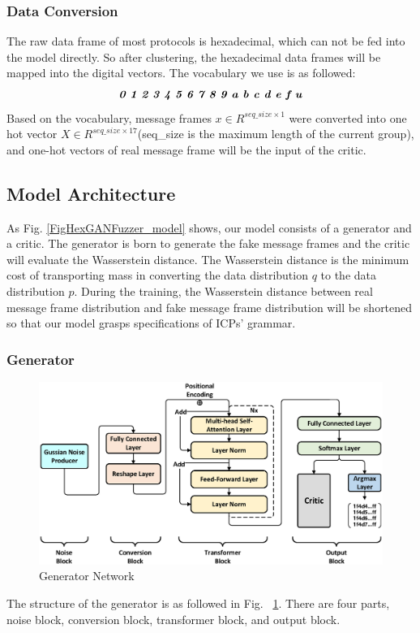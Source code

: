 \subsubsection{\textbf{Data Conversion}}
The raw data frame of most protocols is hexadecimal, which can not be fed into the model directly. So after clustering, the hexadecimal data frames will be mapped into the digital vectors. The vocabulary we use is as followed:
\begin{equation}
\textit{\textbf{0 1 2 3 4 5 6 7 8 9 a b c d e f u}}
\end{equation}
Based on the vocabulary, message frames $x \in R^{seq\_size \times 1}$ were converted into one hot vector $X \in R^{seq\_size \times 17}$(seq\_size is the maximum length of the current group), and one-hot vectors of real message frame will be the input of the critic.



\subsection{Model Architecture}
\label{sec:model_design} 
As Fig. \ref{FigHexGANFuzzer_model} shows, our model consists of a generator and a critic. 
The generator is born to generate the fake message frames and the critic will evaluate the Wasserstein distance. The Wasserstein distance is the minimum cost of transporting mass in converting the data distribution $q$ to the data distribution $p$. During the training, the Wasserstein distance between real message frame distribution and fake message frame distribution will be shortened so that our model grasps specifications of ICPs' grammar.

\subsubsection{\textbf{Generator}}
\begin{figure}[t]   %
	\centering 
	\includegraphics[width=\textwidth]{Figure/FigHexGANFuzzer_Generator.eps}
	\caption{Generator Network}
	\label{FigHexGANFuzzer_Generator}
\end{figure}
The structure of the generator is as followed in Fig. ~\ref{FigHexGANFuzzer_Generator}. 
There are four parts, noise block, conversion block, transformer block, and output block. 

